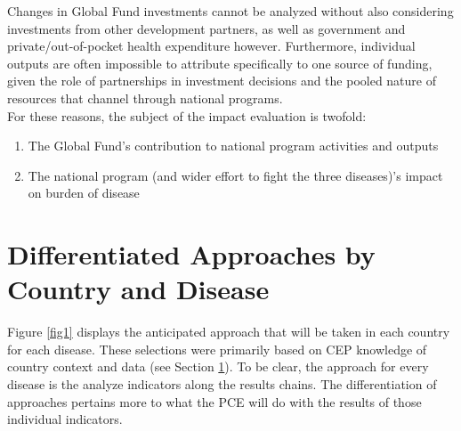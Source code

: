 \documentclass[twocolumn]{bmcart}%
\begin{document}
Changes in Global Fund investments cannot be analyzed without also considering investments from other development partners, as well as government and private/out-of-pocket health expenditure however. Furthermore, individual outputs are often impossible to attribute specifically to one source of funding, given the role of partnerships in investment decisions and the pooled nature of resources that channel through national programs. \\

For these reasons, the subject of the impact evaluation is twofold:
\begin{enumerate}
  \item The Global Fund's contribution to national program activities and outputs
  \item The national program (and wider effort to fight the three diseases)'s impact on burden of disease
\end{enumerate}

\section{Differentiated Approaches by Country and Disease} \label{why}

Figure \ref{fig1} displays the anticipated approach that will be taken in each country for each disease. These selections were primarily based on CEP knowledge of country context and data (see Section \ref{why}). To be clear, the approach for every disease is the analyze indicators along the results chains. The differentiation of approaches pertains more to what the PCE will do with the results of those individual indicators. \\
\end{document}
